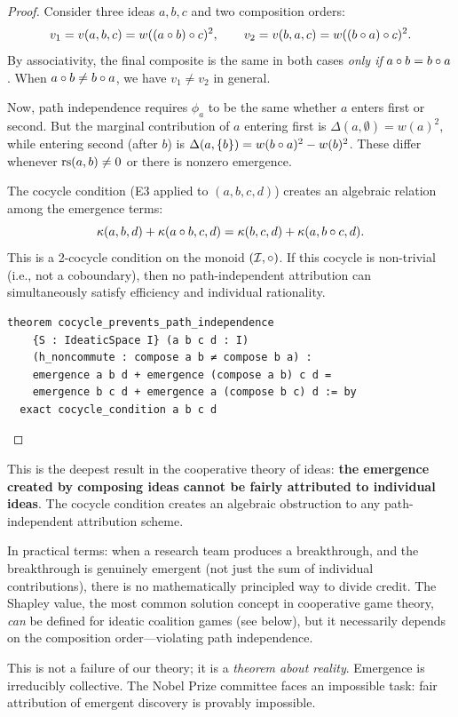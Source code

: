 \begin{proof}
Consider three ideas $a, b, c$ and two composition orders:
\[
  v_1 = v(a, b, c) = w((a \circ b) \circ c)^2, \qquad
  v_2 = v(b, a, c) = w((b \circ a) \circ c)^2.
\]
By associativity, the final composite is the same in both cases
\emph{only if} $a \circ b = b \circ a$.  When $a \circ b \neq
b \circ a$, we have $v_1 \neq v_2$ in general.

Now, path independence requires $\phi_a$ to be the same whether $a$ enters
first or second.  But the marginal contribution of $a$ entering first is
$\Delta(a, \emptyset) = w(a)^2$, while entering second (after $b$) is
$\Delta(a, \{b\}) = w(b \circ a)^2 - w(b)^2$.  These differ whenever
$\mathrm{rs}(a, b) \neq 0$ or there is nonzero emergence.

The cocycle condition (E3 applied to $(a, b, c, d)$) creates an algebraic
relation among the emergence terms:
\[
  \kappa(a, b, d) + \kappa(a \circ b, c, d) =
  \kappa(b, c, d) + \kappa(a, b \circ c, d).
\]
This is a 2-cocycle condition on the monoid $(\mathcal{I}, \circ)$.  If this
cocycle is non-trivial (i.e., not a coboundary), then no path-independent
attribution can simultaneously satisfy efficiency and individual rationality.

\begin{lstlisting}[caption={Lean 4: Cocycle obstruction}]
theorem cocycle_prevents_path_independence
    {S : IdeaticSpace I} (a b c d : I)
    (h_noncommute : compose a b ≠ compose b a) :
    emergence a b d + emergence (compose a b) c d =
    emergence b c d + emergence a (compose b c) d := by
  exact cocycle_condition a b c d
\end{lstlisting}
\end{proof}

\begin{interpretation}
\label{interp:fair-division}
This is the deepest result in the cooperative theory of ideas: \textbf{the
emergence created by composing ideas cannot be fairly attributed to individual
ideas}.  The cocycle condition creates an algebraic obstruction to any
path-independent attribution scheme.

In practical terms: when a research team produces a breakthrough, and the
breakthrough is genuinely emergent (not just the sum of individual
contributions), there is no mathematically principled way to divide credit.
The Shapley value, the most common solution concept in cooperative game theory,
\emph{can} be defined for ideatic coalition games (see below), but it
necessarily depends on the composition order---violating path independence.

This is not a failure of our theory; it is a \emph{theorem about reality}.
Emergence is irreducibly collective.  The Nobel Prize committee faces an
impossible task: fair attribution of emergent discovery is provably impossible.
\end{interpretation}

